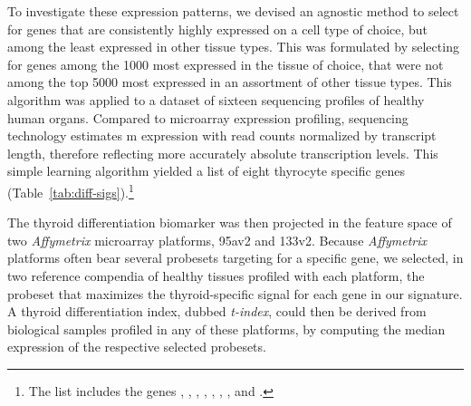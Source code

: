 To investigate these expression patterns, we devised an agnostic method to
select for genes that are consistently highly expressed on a cell type of
choice, but among the least expressed in other tissue types.  This was
formulated by selecting for genes among the \num{1000} most expressed in the
tissue of choice, that were not among the top \num{5000} most expressed in an
assortment of other tissue types.  This algorithm was applied to a dataset of
sixteen  sequencing profiles of healthy human
organs.\cite{bodymap_2.0_2012} Compared to microarray expression profiling,
 sequencing technology estimates m expression with
read counts normalized by transcript length, therefore reflecting more
accurately absolute transcription levels.\cite{wang_rna-seq:_2009} This simple
learning algorithm yielded a list of eight thyrocyte specific genes
(Table~\ref{tab:diff-sigs}).\footnote{The list includes the genes
  , , ,
  , , ,
  , and .}


The thyroid differentiation biomarker was then projected in the feature space of
two \emph{Affymetrix} microarray platforms, 95av2 and
133v2.  Because \emph{Affymetrix} platforms often bear several
probesets targeting for a specific gene, we selected, in two reference compendia
of healthy tissues profiled with each platform, the probeset that maximizes the
thyroid-specific signal for each gene in our signature.  A thyroid
differentiation index, dubbed \emph{\mbox{t-index}}, could then be derived from
biological samples profiled in any of these platforms, by computing the median
expression of the respective selected probesets.

